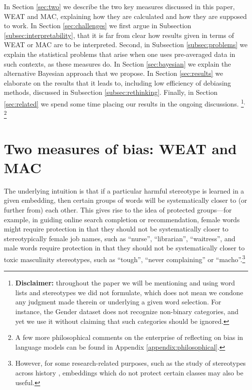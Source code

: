 \documentclass{clv3}
\begin{document}
In Section \ref{sec:two} we describe the two key measures discussed in
this paper, \textsf{WEAT} and \textsf{MAC}, explaining how they are
calculated and how they are supposed to work. In Section
\ref{sec:challenges} we first argue in Subsection
\ref{subsec:interpretability}, that it is far from clear how results
given in terms of \textsf{WEAT} or \textsf{MAC} are to be interpreted.
Second, in Subsection \ref{subsec:problems} we explain the statistical
problems that arise when one uses pre-averaged data in such contexts, as
these measures do. In Section \ref{sec:bayesian} we explain the
alternative Bayesian approach that we propose. In Section
\ref{sec:results} we elaborate on the results that it leads to,
including low  efficiency of debiasing methods, discussed in Subsection \ref{subsec:rethinking}. Finally, in
Section \ref{sec:related} we spend some time placing our results in the
ongoing discussions. \footnote{\textbf{Disclaimer:} throughout the paper
  we will be mentioning and using word lists and stereotypes we did not
  formulate, which does not mean we condone any judgment made therein or
  underlying a given word selection. For instance, the Gender dataset
  does not recognize non-binary categories, and yet we use it without
  claiming that such categories should be ignored.}$^{, }$ \footnote{A few more philosophical comments on the enterprise of reflecting on bias in language models can be found in Appendix \ref{appendix:philosophical}.}




\hypertarget{two-measures-of-bias-weat-and-mac}{%
\section{Two measures of bias: WEAT and
MAC}\label{two-measures-of-bias-weat-and-mac}}

\label{sec:two}

The underlying intuition is that if a particular harmful stereotype is
learned in a given embedding, then certain groups of words will be
systematically closer to (or further from) each other. This gives rise
to the idea of protected groups---for example, in guiding online search
completion or recommendation, female words might require protection in
that they should not be systematically closer to stereotypically female
job names, such as ``nurse'', ``librarian'', ``waitress'', and male
words require protection in that they should not be systematically
closer to toxic masculinity stereotypes, such as ``tough'', ``never
complaining'' or ``macho''.\footnote{However, for some research-related
  purposes, such as the study of stereotypes across history \citep{Garg2018years},
  embeddings which do not protect certain classes may also be useful.}
\end{document}
